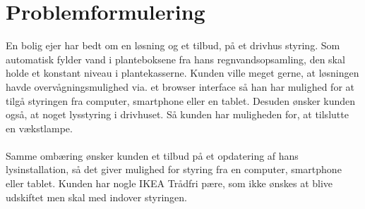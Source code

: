 \section{Problemformulering}

En bolig ejer har bedt om en løsning og et tilbud, på et drivhus styring. 
Som automatisk fylder vand i planteboksene fra hans regnvandsopsamling, den skal holde et konstant niveau i plantekasserne. 
Kunden ville meget gerne, at løsningen havde overvågningsmulighed via. et browser interface så han har mulighed for at tilgå styringen fra 
computer, smartphone eller en tablet.
Desuden ønsker kunden også, at noget lysstyring i drivhuset. Så kunden har muligheden for, at tilslutte en vækstlampe.
\\
\\
Samme ombæring ønsker kunden et tilbud på et opdatering af hans lysinstallation, så det giver mulighed for styring fra en computer, smartphone eller tablet.
Kunden har nogle IKEA Trådfri pære, som ikke ønskes at blive udskiftet men skal med indover styringen.
